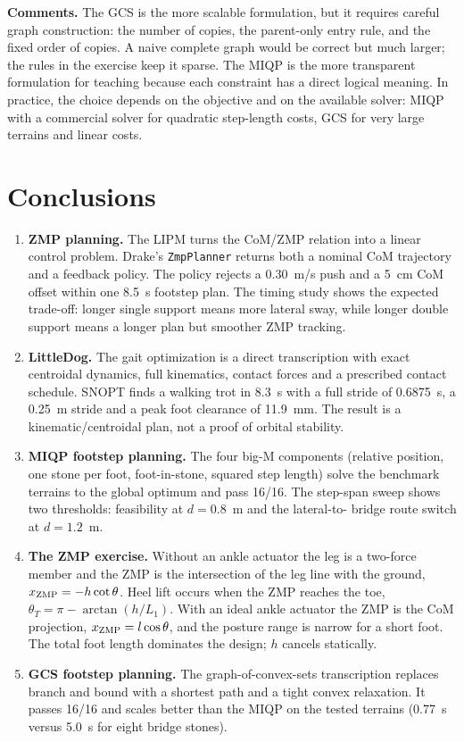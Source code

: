 \documentclass[11pt]{article}
\begin{document}
\textbf{Comments.}  The GCS is the more scalable formulation, but it requires
careful graph construction: the number of copies, the parent-only entry rule,
and the fixed order of copies.  A naive complete graph would be correct but
much larger; the rules in the exercise keep it sparse.  The MIQP is the more
transparent formulation for teaching because each constraint has a direct
logical meaning.  In practice, the choice depends on the objective and on the
available solver: MIQP with a commercial solver for quadratic step-length
costs, GCS for very large terrains and linear costs.

\section{Conclusions}

\begin{enumerate}[leftmargin=1.4em]
  \item \textbf{ZMP planning.}  The LIPM turns the CoM/ZMP relation into a
  linear control problem.  Drake's \texttt{ZmpPlanner} returns both a nominal
  CoM trajectory and a feedback policy.  The policy rejects a 0.30~m/s push
  and a 5~cm CoM offset within one 8.5~s footstep plan.  The timing study shows
  the expected trade-off: longer single support means more lateral sway, while
  longer double support means a longer plan but smoother ZMP tracking.
  \item \textbf{LittleDog.}  The gait optimization is a direct transcription
  with exact centroidal dynamics, full kinematics, contact forces and a
  prescribed contact schedule.  SNOPT finds a walking trot in 8.3~s with a
  full stride of 0.6875~s, a 0.25~m stride and a peak foot clearance of
  11.9~mm.  The result is a kinematic/centroidal plan, not a proof of orbital
  stability.
  \item \textbf{MIQP footstep planning.}  The four big-M components (relative
  position, one stone per foot, foot-in-stone, squared step length) solve the
  benchmark terrains to the global optimum and pass 16/16.  The step-span
  sweep shows two thresholds: feasibility at $d=0.8$~m and the lateral-to-
  bridge route switch at $d=1.2$~m.
  \item \textbf{The ZMP exercise.}  Without an ankle actuator the leg is a
  two-force member and the ZMP is the intersection of the leg line with the
  ground, $x_{\rm ZMP}=-h\cot\theta$.  Heel lift occurs when the ZMP reaches
  the toe, $\theta_T=\pi-\arctan(h/L_1)$.  With an ideal ankle actuator the ZMP
  is the CoM projection, $x_{\rm ZMP}=l\cos\theta$, and the posture range is
  narrow for a short foot.  The total foot length dominates the design; $h$
  cancels statically.
  \item \textbf{GCS footstep planning.}  The graph-of-convex-sets transcription
  replaces branch and bound with a shortest path and a tight convex relaxation.
  It passes 16/16 and scales better than the MIQP on the tested terrains
  (0.77~s versus 5.0~s for eight bridge stones).
\end{enumerate}
\end{document}
